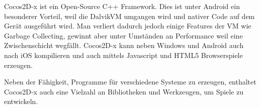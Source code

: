 Cocos2D-x ist ein Open-Source C++ Framework. Dies ist unter Android ein besonderer Vorteil, weil die DalvikVM umgangen wird und nativer Code auf dem Gerät ausgeführt wird.
Man verliert dadurch jedoch einige Features der VM wie Garbage Collecting, gewinnt aber unter Umständen an Performance weil eine Zwischenschicht wegfällt.
Cocos2D-x kann neben Windows und Android auch nach iOS kompilieren und auch mittels Javascript und HTML5 Browserspiele erzeugen.

Neben der Fähigkeit, Programme für verschiedene Systeme zu erzeugen, enthaltet Cocos2D-x auch eine Vielzahl an Bibliotheken und Werkzeugen, um Spiele zu entwickeln.